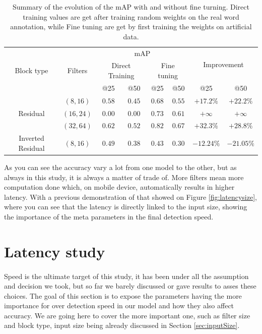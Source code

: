 \begin{table}[]
    \centering
    \caption{Summary of the evolution of the mAP with and without fine turning. Direct training values are get after training random weights on the real word annotation, while Fine tuning are get by first training the weights on artificial data.}
    \begin{tabular}{|c|c|c|c|c|c|c|c|}
        \hline
        \multirow{3}{*}{Block type} & \multirow{3}{*}{Filters} & \multicolumn{4}{|c|}{mAP} & \multicolumn{2}{|c|}{\multirow{2}{*}{Improvement}} \\
        & & \multicolumn{2}{|c|}{Direct Training} & \multicolumn{2}{|c|}{Fine tuning} & \multicolumn{2}{|c|}{}\\ 
        & & @25 & @50 & @25 & @50 & @25 & @50 \\ \hline
        \multirow{3}{*}{Residual} & $(8,16)$   & $0.58$ & $0.45$ & $0.68$ & $0.55$ & $+17.2\%$ &                               $+22.2\%$ \\
                                  & $(16,24)$ & $0.00$ & $0.00$ & $0.73$ & $0.61$ & $+\infty$ & $+\infty$ \\
                                  & $(32,64)$ & $0.62$ & $0.52$ & $0.82$ & $0.67$ & $+32.3\%$ & $+28.8\%$ \\ \hline
        Inverted Residual         & $(8,16)$   & $0.49$ & $0.38$ & $0.43$ & $0.30$ & $-12.24\%$ &                               $-21.05\%$\\ \hline
    \end{tabular}
    \label{tab:mapFineTuning}
\end{table}


As you can see the accuracy vary a lot from one model to the other, but as always in this study, it is always a matter of trade of. More filters mean more computation done which, on mobile device, automatically results in higher latency. With a previous demonstration of that showed on Figure \ref{fig:latencysize}, where you can see that the latency is directly linked to the input size, showing the importance of the meta parameters in the final detection speed.

\section{Latency study}
\paragraph{}
Speed is the ultimate target of this study, it has been under all the assumption and decision we took, but so far we barely discussed or gave results to asses these choices. The goal of this section is to expose the parameters having the more importance for over detection speed in our model and how they also affect accuracy. We are going here to cover the more important one, such as filter size and block type, input size being already discussed in Section \ref{sec:inputSize}.

